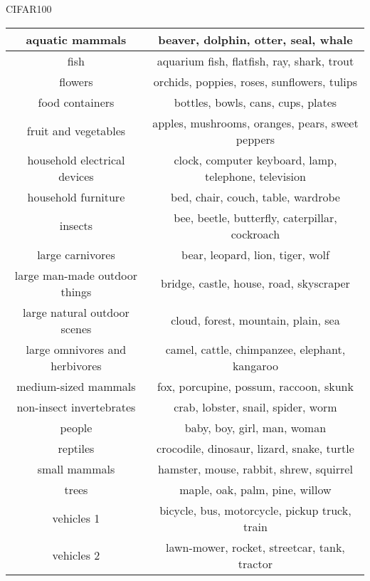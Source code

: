 \documentclass{beamer}
\begin{document}
\begin{frame}[fragile]{CIFAR100}
 \begin{table}
  \centering
  \begin{tabular}{|c|c|}
   \hline
   aquatic mammals                & beaver, dolphin, otter, seal, whale                   \\
   \hline
   fish                           & aquarium fish, flatfish, ray, shark, trout            \\
   \hline

   flowers                        & orchids, poppies, roses, sunflowers, tulips           \\
   \hline
   food containers                & bottles, bowls, cans, cups, plates                    \\
   \hline
   fruit and vegetables           & apples, mushrooms, oranges, pears, sweet peppers      \\
   \hline
   household electrical devices   & clock, computer keyboard, lamp, telephone, television \\
   \hline
   household furniture            & bed, chair, couch, table, wardrobe                    \\
   \hline
   insects                        & bee, beetle, butterfly, caterpillar, cockroach        \\
   \hline
   large carnivores               & bear, leopard, lion, tiger, wolf                      \\
   \hline
   large man-made outdoor things  & bridge, castle, house, road, skyscraper               \\
   \hline
   large natural outdoor scenes   & cloud, forest, mountain, plain, sea                   \\
   \hline
   large omnivores and herbivores & camel, cattle, chimpanzee, elephant, kangaroo         \\
   \hline
   medium-sized mammals           & fox, porcupine, possum, raccoon, skunk                \\
   \hline
   non-insect invertebrates       & crab, lobster, snail, spider, worm                    \\
   \hline
   people                         & baby, boy, girl, man, woman                           \\
   \hline
   reptiles                       & crocodile, dinosaur, lizard, snake, turtle            \\
   \hline
   small mammals                  & hamster, mouse, rabbit, shrew, squirrel               \\
   \hline
   trees                          & maple, oak, palm, pine, willow                        \\
   \hline
   vehicles 1                     & bicycle, bus, motorcycle, pickup truck, train         \\
   \hline
   vehicles 2                     & lawn-mower, rocket, streetcar, tank, tractor          \\
   \hline
  \end{tabular}
 \end{table}

\end{frame}
\end{document}
